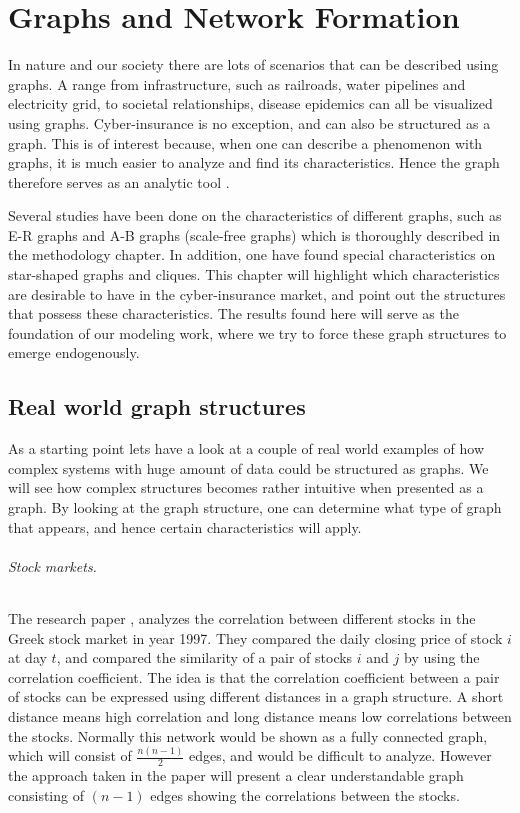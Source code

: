 \chapter{Graphs and Network Formation}
\label{chp:graphTheory} 

In nature and our society there are lots of scenarios that can be described using graphs. A range from infrastructure, such as railroads, water pipelines and electricity grid, to societal relationships, disease epidemics can all be visualized using graphs. Cyber-insurance is no exception, and can also be structured as a graph. This is of interest because, when one can describe a phenomenon with graphs, it is much easier to analyze and find its characteristics. Hence the graph therefore serves as an analytic tool \cite{audestad}. 

Several studies have been done on the characteristics of different graphs, such as E-R graphs and A-B graphs (scale-free graphs) which is thoroughly described in the methodology chapter. In addition, one have found special characteristics on star-shaped graphs and cliques. This chapter will highlight which characteristics are desirable to have in the cyber-insurance market, and point out the structures that possess these characteristics. The results found here will serve as the foundation of our modeling work, where we try to force these graph structures to emerge endogenously. 
 
\section{Real world graph structures}
As a starting point lets have a look at a couple of real world examples of how complex systems with huge amount of data could be structured as graphs. We will see how complex structures becomes rather intuitive when presented as a graph. By looking at the graph structure, one can determine what type of graph that appears, and hence certain characteristics will apply.  

\subparagraph{Stock markets.} The research paper \cite{greekStockMarket}, analyzes the correlation between different stocks in the Greek stock market in year 1997. They compared the daily closing price of stock $i$ at day $t$, and compared the similarity of a pair of stocks $i$ and $j$ by using the correlation coefficient. The idea is that the correlation coefficient between a pair of stocks can be expressed using different distances in a graph structure. A short distance means high correlation and long distance means low correlations between the stocks. Normally this network would be shown as a fully connected graph, which will consist of $\frac{n(n-1)}{2}$ edges, and would be difficult to analyze. However the approach taken in the paper will present a clear understandable graph consisting of $(n-1)$ edges showing the correlations between the stocks.

